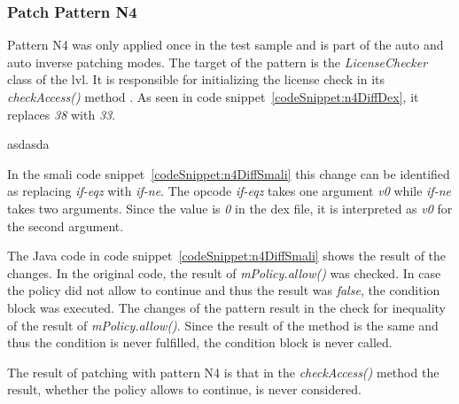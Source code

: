 \subsubsection{Patch Pattern N4}
Pattern N4 was only applied once in the test sample and is part of the auto and auto inverse patching modes.
The target of the pattern is the \textit{LicenseChecker} class of the \gls{lvl}.
It is responsible for initializing the license check in its \textit{checkAccess()} method \cite{developersLicensingReference}.
\newline
As seen in code snippet~\ref{codeSnippet:n4DiffDex}, it replaces \textit{38} with \textit{33}.
\newline

asdasda
\newline

In the smali code snippet~\ref{codeSnippet:n4DiffSmali} this change can be identified as replacing \textit{if-eqz} with \textit{if-ne}.
The opcode \textit{if-eqz} takes one argument \textit{v0} while \textit{if-ne} takes two arguments.
Since the value is \textit{0} in the \gls{dex} file, it is interpreted as \textit{v0} for the second argument.
\newline

The Java code in code snippet~\ref{codeSnippet:n4DiffSmali} shows the result of the changes.
In the original code, the result of \textit{mPolicy.allow()} was checked.
In case the policy did not allow to continue and thus the result was \textit{false}, the condition block was executed.
The changes of the pattern result in the check for inequality of the result of \textit{mPolicy.allow()}.
Since the result of the method is the same and thus the condition is never fulfilled, the condition block is never called.
\newline

The result of patching with pattern N4 is that in the \textit{checkAccess()} method the result, whether the policy allows to continue, is never considered.

